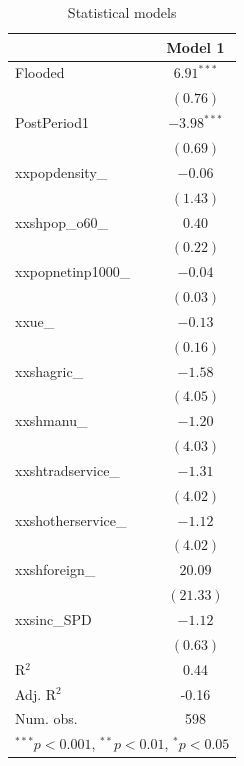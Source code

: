 \documentclass[ignorenonframetext,]{beamer}
\begin{document}
\begin{frame}[fragile]
\begin{table}
\begin{center}
\begin{tabular}{l c }
\hline
 & Model 1 \\
\hline
Flooded            & $6.91^{***}$  \\
                   & $(0.76)$      \\
PostPeriod1        & $-3.98^{***}$ \\
                   & $(0.69)$      \\
xxpopdensity\_     & $-0.06$       \\
                   & $(1.43)$      \\
xxshpop\_o60\_     & $0.40$        \\
                   & $(0.22)$      \\
xxpopnetinp1000\_  & $-0.04$       \\
                   & $(0.03)$      \\
xxue\_             & $-0.13$       \\
                   & $(0.16)$      \\
xxshagric\_        & $-1.58$       \\
                   & $(4.05)$      \\
xxshmanu\_         & $-1.20$       \\
                   & $(4.03)$      \\
xxshtradservice\_  & $-1.31$       \\
                   & $(4.02)$      \\
xxshotherservice\_ & $-1.12$       \\
                   & $(4.02)$      \\
xxshforeign\_      & $20.09$       \\
                   & $(21.33)$     \\
xxsinc\_SPD        & $-1.12$       \\
                   & $(0.63)$      \\
\hline
R$^2$              & 0.44          \\
Adj. R$^2$         & -0.16         \\
Num. obs.          & 598           \\
\hline
\multicolumn{2}{l}{\scriptsize{$^{***}p<0.001$, $^{**}p<0.01$, $^*p<0.05$}}
\end{tabular}
\caption{Statistical models}
\label{table:coefficients}
\end{center}
\end{table}

\normalsize

\end{frame}
\end{document}
